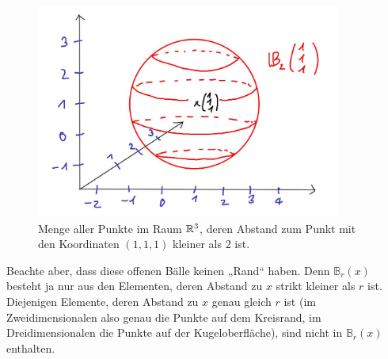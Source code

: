 \begin{bem}
    \begin{figure}[H]
\begin{center}
\includegraphics[width=10cm]{./_img/3Dball.jpeg}
\end{center}
\centering \caption{Menge aller Punkte im Raum ${\mathbb R}^3$, deren Abstand zum Punkt mit den Koordinaten $(1,1,1)$ kleiner als $2$ ist.}
\end{figure}
Beachte aber, dass diese offenen Bälle keinen „Rand“ haben. Denn $\mathbb{B}_r(x)$ besteht ja nur aus den Elementen, deren Abstand zu $x$ strikt kleiner als $r$ ist. Diejenigen Elemente, deren Abstand zu $x$ genau gleich $r$ ist (im Zweidimensionalen also genau die Punkte auf dem Kreisrand, im Dreidimensionalen die Punkte auf der Kugeloberfläche), sind nicht in $\mathbb{B}_r(x)$ enthalten.
\end{bem}




